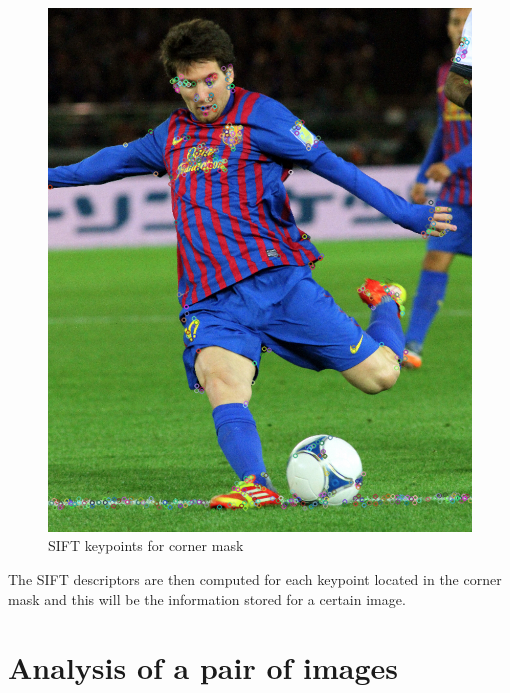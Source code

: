 \begin{figure}[ht!]
\begin{minipage}{.5\textwidth}
	\includegraphics[width=.8\linewidth]{images/messiCornerSift.png}
	\caption{SIFT keypoints for corner mask}
	\label{fig:messiCornerSift}
\end{minipage}
\end{figure}

The SIFT descriptors are then computed for each keypoint located in the corner mask and this will be the information stored for a certain image.

\section{Analysis of a pair of images}
